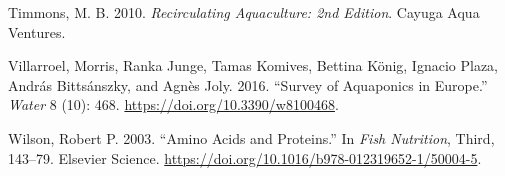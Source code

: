 \documentclass[preprint, 3p,
authoryear]{elsarticle} %
\newlength{\cslhangindent}
\newlength{\cslentryspacingunit} %
\newenvironment{CSLReferences}[2] %
 {%
  \setlength{\parindent}{0pt}
  \ifodd #1
  \let\oldpar\par
  \def\par{\hangindent=\cslhangindent\oldpar}
  \fi
  \setlength{\parskip}{#2\cslentryspacingunit}
 }%
 {}
\begin{document}
\begin{CSLReferences}{1}{0}
\leavevmode{}%
Timmons, M. B. 2010. \emph{Recirculating Aquaculture: 2nd Edition}.
Cayuga Aqua Ventures.

\leavevmode{}%
Villarroel, Morris, Ranka Junge, Tamas Komives, Bettina König, Ignacio
Plaza, András Bittsánszky, and Agnès Joly. 2016. {``Survey of Aquaponics
in Europe.''} \emph{Water} 8 (10): 468.
\url{https://doi.org/10.3390/w8100468}.

\leavevmode{}%
Wilson, Robert P. 2003. {``{Amino Acids and Proteins}.''} In \emph{Fish
Nutrition}, Third, 143--79. Elsevier Science.
\url{https://doi.org/10.1016/b978-012319652-1/50004-5}.

\end{CSLReferences}
\end{document}
